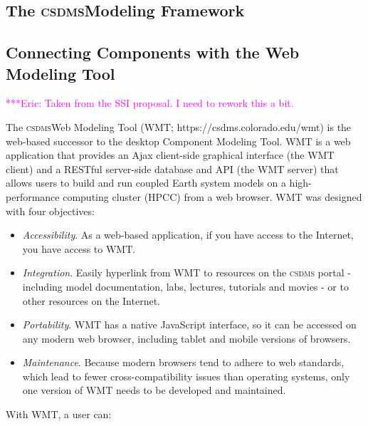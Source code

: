\documentclass[11pt, oneside]{amsart}
\newcommand{\huttonnote}[1]{ {\textcolor{magenta}    { ***Eric:      #1 }}}
\DeclareRobustCommand{\csdms}{\textsc{csdms}}
\begin{document}
\subsection{The \csdms Modeling Framework}


\subsection{Connecting Components with the Web Modeling Tool}

\huttonnote{Taken from the SSI proposal. I need to rework this a bit.}

The \csdms Web Modeling Tool (WMT; https://csdms.colorado.edu/wmt) is the
web-based successor to the desktop Component Modeling Tool. WMT is a web
application that provides an Ajax client-side graphical interface (the WMT
client) and a RESTful server-side database and API (the WMT server) that allows
users to build and run coupled Earth system models on a high-performance
computing cluster (HPCC) from a web browser.
WMT was designed with four objectives:
\begin{itemize}

\item  \emph{Accessibility}. As a web-based application, if you have access
to the Internet, you have access to WMT.

\item  \emph{Integration}. Easily hyperlink from WMT to resources on the \csdms
portal - including model documentation, labs, lectures, tutorials and
movies - or to other resources on the Internet.

\item \emph{Portability}. WMT has a native JavaScript interface, so it can be
accessed on any modern web browser, including tablet and mobile
versions of browsers.

\item \emph{Maintenance}. Because modern browsers tend to adhere to web
standards, which lead to fewer cross-compatibility issues than
operating systems, only one version of WMT needs to be developed
and maintained.

\end{itemize}

With WMT, a user can:
\end{document}
